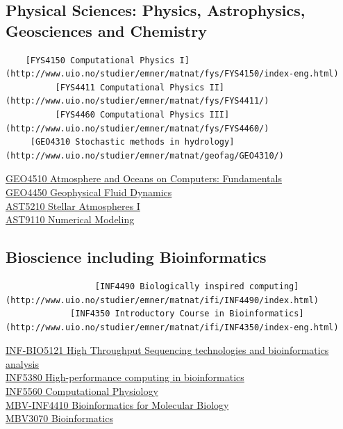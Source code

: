 \documentclass[]{article}
\begin{document}
\hypertarget{physical-sciences-physics-astrophysics-geosciences-and-chemistry}{%
\subsection{Physical Sciences: Physics, Astrophysics, Geosciences and
Chemistry}\label{physical-sciences-physics-astrophysics-geosciences-and-chemistry}}

\begin{verbatim}
    [FYS4150 Computational Physics I](http://www.uio.no/studier/emner/matnat/fys/FYS4150/index-eng.html)         
          [FYS4411 Computational Physics II](http://www.uio.no/studier/emner/matnat/fys/FYS4411/)                
          [FYS4460 Computational Physics III](http://www.uio.no/studier/emner/matnat/fys/FYS4460/)               
     [GEO4310 Stochastic methods in hydrology](http://www.uio.no/studier/emner/matnat/geofag/GEO4310/)           
\end{verbatim}

\href{http://www.uio.no/studier/emner/matnat/geofag/GEF4510/}{GEO4510
Atmosphere and Oceans on Computers: Fundamentals}\\
\href{http://www.uio.no/studier/emner/matnat/geofag/GEF4450/index-eng.html}{GEO4450
Geophysical Fluid Dynamics}\\
\href{http://www.uio.no/studier/emner/matnat/astro/AST5210/index-eng.html}{AST5210
Stellar Atmospheres I}\\
\href{http://www.uio.no/studier/emner/matnat/astro/AST9110/index-eng.html}{AST9110
Numerical Modeling}

\hypertarget{bioscience-including-bioinformatics}{%
\subsection{Bioscience including
Bioinformatics}\label{bioscience-including-bioinformatics}}

\begin{verbatim}
                  [INF4490 Biologically inspired computing](http://www.uio.no/studier/emner/matnat/ifi/INF4490/index.html)                        
             [INF4350 Introductory Course in Bioinformatics](http://www.uio.no/studier/emner/matnat/ifi/INF4350/index-eng.html)                   
\end{verbatim}

\href{http://www.uio.no/studier/emner/matnat/ifi/INF-BIO5121/index.html}{INF-BIO5121
High Throughput Sequencing technologies and bioinformatics analysis}\\
\href{http://www.uio.no/studier/emner/matnat/ifi/INF5380/}{INF5380
High-performance computing in bioinformatics}\\
\href{http://www.uio.no/studier/emner/matnat/ifi/INF5560/}{INF5560
Computational Physiology}\\
\href{http://www.uio.no/studier/emner/matnat/ibv/MBV-INF4410/}{MBV-INF4410
Bioinformatics for Molecular Biology}\\
\href{http://www.uio.no/studier/emner/matnat/ibv/MBV3070/index-eng.html}{MBV3070
Bioinformatics}
\end{document}
